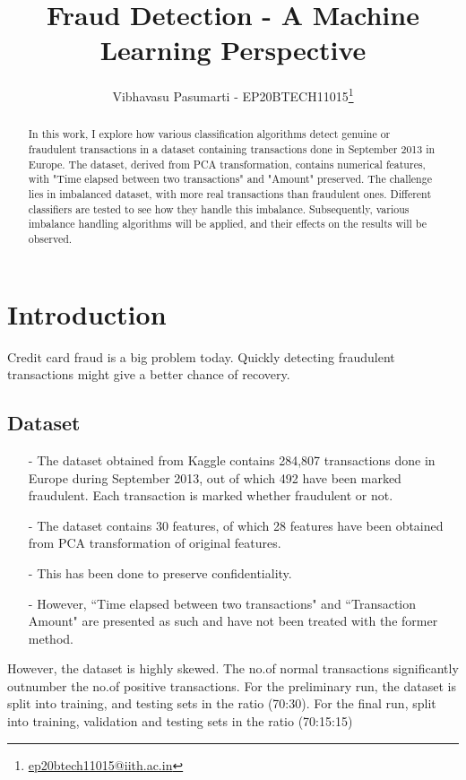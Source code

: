 \documentclass[letterpaper, 11 pt, conference]{ieeeconf}  %
\title{\huge \bf Fraud Detection - A Machine Learning Perspective}
\author{Vibhavasu Pasumarti - EP20BTECH11015\footnote{\href{emailto:ep20btech11015@iith.ac.in}{ep20btech11015@iith.ac.in}}}
\begin{document}
\maketitle

\begin{abstract}
    In this work, I explore how various classification algorithms detect genuine or fraudulent transactions in a dataset containing transactions done in September 2013 in Europe. The dataset, derived from PCA transformation, contains numerical features, with "Time elapsed between two transactions" and "Amount" preserved. The challenge lies in imbalanced dataset, with more real transactions than fraudulent ones. Different classifiers are tested to see how they handle this imbalance. Subsequently, various imbalance handling algorithms will be applied, and their effects on the results will be observed.
\end{abstract}

\section{Introduction}\label{sec:intro}
Credit card fraud is a big problem today. Quickly detecting fraudulent transactions might give a better chance of recovery.

\subsection*{Dataset}
\begin{itemize}
\item[-] The dataset obtained from Kaggle contains 284,807 transactions done in Europe during September 2013, out of which 492 have been marked fraudulent. Each transaction is marked whether fraudulent or not.
\item[-] The dataset contains 30 features, of which 28 features have been obtained from PCA transformation of original features.
\item[-] This has been done to preserve confidentiality.
\item[-] However, ``Time elapsed between two transactions" and ``Transaction Amount" are presented as such and have not been treated with the former method.
\end{itemize}

However, the dataset is highly skewed. The no.of normal transactions significantly outnumber the no.of positive transactions. For the preliminary run, the dataset is split into training, and testing sets in the ratio (70:30). For the final run, split into training, validation and testing sets in the ratio (70:15:15)
\end{document}
